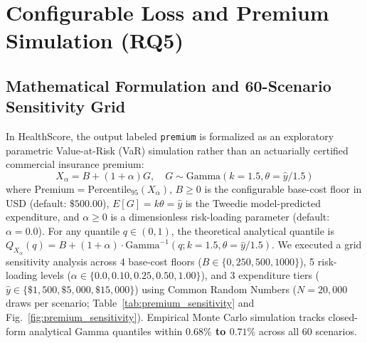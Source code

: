 \documentclass[runningheads]{llncs}
\begin{document}
\section{Configurable Loss and Premium Simulation (RQ5)}

\subsection{Mathematical Formulation and 60-Scenario Sensitivity Grid}
In HealthScore, the output labeled \texttt{premium} is formalized as an exploratory parametric Value-at-Risk (VaR) simulation rather than an actuarially certified commercial insurance premium:
\begin{equation}
X_\alpha = B + (1 + \alpha) G, \quad G \sim \text{Gamma}(k=1.5, \theta=\hat{y}/1.5)
\end{equation}
where $\text{Premium} = \text{Percentile}_{95}(X_\alpha)$, $B \ge 0$ is the configurable base-cost floor in USD (default: $\$500.00$), $E[G] = k\theta = \hat{y}$ is the Tweedie model-predicted expenditure, and $\alpha \ge 0$ is a dimensionless risk-loading parameter (default: $\alpha = 0.0$). For any quantile $q \in (0, 1)$, the theoretical analytical quantile is $Q_{X_\alpha}(q) = B + (1 + \alpha) \cdot \text{Gamma}^{-1}(q; k=1.5, \theta=\hat{y}/1.5)$. We executed a grid sensitivity analysis across 4 base-cost floors ($B \in \{0, 250, 500, 1000\}$), 5 risk-loading levels ($\alpha \in \{0.0, 0.10, 0.25, 0.50, 1.00\}$), and 3 expenditure tiers ($\hat{y} \in \{\$1,500, \$5,000, \$15,000\}$) using Common Random Numbers ($N = 20,000$ draws per scenario; Table~\ref{tab:premium_sensitivity} and Fig.~\ref{fig:premium_sensitivity}). Empirical Monte Carlo simulation tracks closed-form analytical Gamma quantiles within \textbf{$0.68\%$ to $0.71\%$} across all 60 scenarios.
\end{document}
